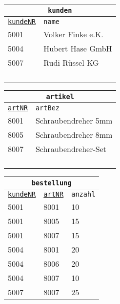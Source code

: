 \begin{Answer}[ref=Normal2]
	\begin{minipage}{\textwidth}
		\begin{minipage}{0.35\textwidth}
			\begin{tabular}{ll}
				\multicolumn{2}{c}{\lstinline!kunden!}\\
				\hline
				\underline{\lstinline!kundeNR!}&\lstinline!name!\\
				\hline
				5001&Volker Finke e.K.\\
				5004&Hubert Hase GmbH\\
				5007&Rudi Rüssel KG\\
				\vphantom{0}&\\
				\vphantom{0}&\\
				\vphantom{0}&\\
				\vphantom{0}&\\
			\end{tabular}
		\end{minipage}
		\begin{minipage}{0.35\textwidth}
			\begin{tabular}{ll}
				\multicolumn{2}{c}{\lstinline!artikel!}\\
				\hline
				\underline{\lstinline!artNR!}&\lstinline!artBez!\\
				\hline
				8001&Schraubendreher 5mm\\
				8005&Schraubendreher 8mm\\
				8007&Schraubendreher-Set\\
				\vphantom{0}&\\
				\vphantom{0}&\\
				\vphantom{0}&\\
				\vphantom{0}&\\
			\end{tabular}
		\end{minipage}
		\begin{minipage}{0.2\textwidth}
			\begin{tabular}{lll}
				\multicolumn{3}{c}{\lstinline!bestellung!}\\
				\hline
				\underline{\lstinline!kundeNR!}&\underline{\lstinline!artNR!}&\lstinline!anzahl!\\
				\hline
				5001&8001&10\\
				5001&8005&15\\
				5001&8007&15\\
				5004&8001&20\\
				5004&8006&20\\
				5004&8007&10\\
				5007&8007&25\\
			\end{tabular}
		\end{minipage}
	\end{minipage}
\end{Answer}